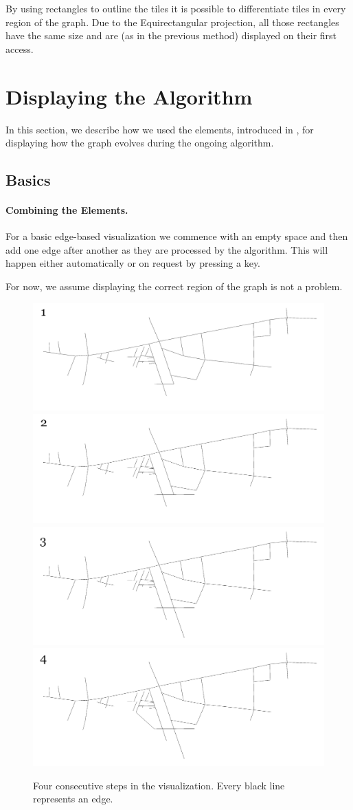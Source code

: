 \documentclass
[
    paper = a4,
    pagesize,
    12 pt,
    twoside,                       %
    open = right,
    DIV = calc,
    BCOR = 0 mm,                   %
    bibtotoc
]
{scrbook}
\begin{document}
By using rectangles to outline the tiles it is possible to differentiate tiles in every region of the graph.
Due to the Equirectangular projection, all those rectangles have the same size and are (as in the previous method) displayed on their first access.


\section{Displaying the Algorithm} \label{algorithm}

In this section, we describe how we used the elements, introduced in , for displaying how the graph evolves during the ongoing algorithm.

\subsection{Basics} \label{basic}

\paragraph{Combining the Elements.}

For a basic edge-based visualization we commence with an empty space and then add one edge after another as they are processed by the algorithm.
This will happen either automatically or on request by pressing a key.

For now, we assume displaying the correct region of the graph is not a problem.

\begin{figure}
    \includegraphics[width=.5\textwidth]{Images/vis-step-one.png}
    \includegraphics[width=.5\textwidth]{Images/vis-step-two.png}
    \includegraphics[width=.5\textwidth]{Images/vis-step-three.png}
    \includegraphics[width=.5\textwidth]{Images/vis-step-four.png}
\caption{Four consecutive steps in the visualization. Every black line represents an edge.}
\label{fig:two-steps}
\end{figure}
\end{document}
